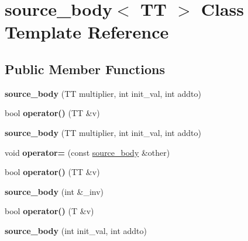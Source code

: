 \hypertarget{classsource__body}{}\section{source\+\_\+body$<$ T\+T $>$ Class Template Reference}
\label{classsource__body}
\subsection*{Public Member Functions}
\begin{DoxyCompactItemize}
\item 
\hypertarget{classsource__body_af6fdd6d7e1001d2905a89eb9390ea17b}{}{\bfseries source\+\_\+body} (T\+T multiplier, int init\+\_\+val, int addto)\label{classsource__body_af6fdd6d7e1001d2905a89eb9390ea17b}

\item 
\hypertarget{classsource__body_a0e52d4dc191ec6a638624f99f0c86c16}{}bool {\bfseries operator()} (T\+T \&v)\label{classsource__body_a0e52d4dc191ec6a638624f99f0c86c16}

\item 
\hypertarget{classsource__body_af6fdd6d7e1001d2905a89eb9390ea17b}{}{\bfseries source\+\_\+body} (T\+T multiplier, int init\+\_\+val, int addto)\label{classsource__body_af6fdd6d7e1001d2905a89eb9390ea17b}

\item 
\hypertarget{classsource__body_a7685a0e5bfb13ad50d2287fe09fc9ddf}{}void {\bfseries operator=} (const \hyperlink{classsource__body}{source\+\_\+body} \&other)\label{classsource__body_a7685a0e5bfb13ad50d2287fe09fc9ddf}

\item 
\hypertarget{classsource__body_a0e52d4dc191ec6a638624f99f0c86c16}{}bool {\bfseries operator()} (T\+T \&v)\label{classsource__body_a0e52d4dc191ec6a638624f99f0c86c16}

\item 
\hypertarget{classsource__body_a2f8014d43d9502ee6ba7e9b6a1fd391c}{}{\bfseries source\+\_\+body} (int \&\+\_\+inv)\label{classsource__body_a2f8014d43d9502ee6ba7e9b6a1fd391c}

\item 
\hypertarget{classsource__body_acf056e99ea962b346e33f2159a3e60bf}{}bool {\bfseries operator()} (T \&v)\label{classsource__body_acf056e99ea962b346e33f2159a3e60bf}

\item 
\hypertarget{classsource__body_acaa83ca674775dcf7ce00b48e788f727}{}{\bfseries source\+\_\+body} (int init\+\_\+val, int addto)\label{classsource__body_acaa83ca674775dcf7ce00b48e788f727}


\end{DoxyCompactItemize}
